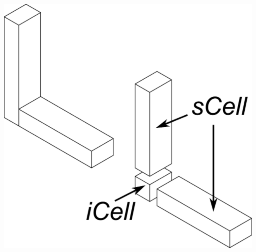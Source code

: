 
\begin{minipage}[t]{\linewidth}
\centering 
\includegraphics[width=0.6\linewidth]{../Common/images/CellDecompExample}
\label{fig_celldecompexample}
\end{minipage}

